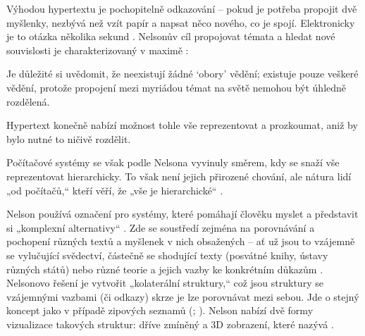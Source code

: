 \label{p:dm:intertw}
Výhodou hypertextu je pochopitelně odkazování -- pokud je potřeba propojit dvě myšlenky, nezbývá než vzít papír a napsat něco nového, co je spojí. Elektronicky je to otázka několika sekund \autocite[DM44]{Nelson1974}. Nelsonův cíl propojovat témata a hledat nové souvislosti je charakterizovaný v maximě :

\begin{quoted}{\autocite[DM45]{Nelson1974}}
Je důležité si uvědomit, že neexistují žádné \enquote*{obory} vědění; existuje pouze veškeré vědění, protože propojení mezi myriádou témat na světě nemohou být úhledně rozdělená.

Hypertext konečně nabízí možnost tohle vše reprezentovat a prozkoumat, aniž by bylo nutné to ničivě rozdělit.
\end{quoted}

Počítačové systémy se však podle Nelsona vyvinuly směrem, kdy se snaží vše reprezentovat hierarchicky. To však není jejich přirozené chování, ale nátura lidí „od počítačů,“ kteří věří, že „vše je hierarchické“ \autocite[17.3]{intertw:Nelson}.

Nelson používá označení  pro systémy, které pomáhají člověku myslet a představit si „komplexní alternativy“ \autocite[DM52]{Nelson1974}. Zde se soustředí zejména na porovnávání a pochopení různých textů a myšlenek v nich obsažených -- ať už jsou to vzájemně se vylučující svědectví, částečně se shodující texty (posvátné knihy, ústavy různých států) nebo různé teorie a jejich vazby ke konkrétním důkazům \autocite[DM52]{Nelson1974}. Nelsonovo řešení je vytvořit „kolaterální struktury,“ což jsou struktury se vzájemnými vazbami (či odkazy) skrze je lze porovnávat mezi sebou. Jde o stejný koncept jako v případě zipových seznamů (; \cite[DM52]{Nelson1974}).
Nelson nabízí dvě formy vizualizace takových struktur: dříve zmíněný  a 3D zobrazení, které nazývá .

